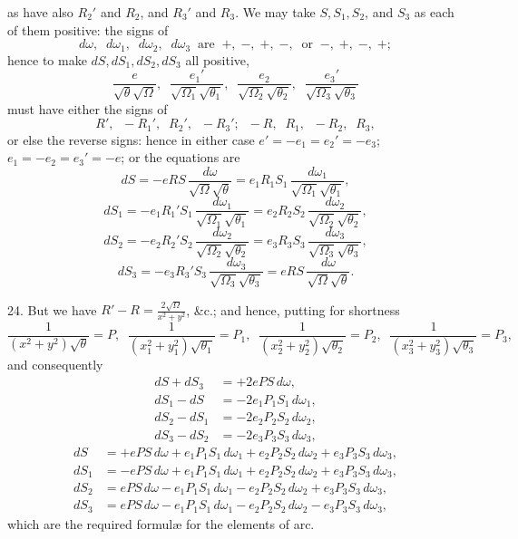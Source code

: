 \documentclass[11pt,a4paper]{article}
\begin{document}
\newpage


\noindent as have also $R_{2}'$ and $R_{2}$, and $R_{3}'$ and $R_{3}$. We may take $S, S_{1}, S_{2}$, and $S_{3}$ as each of them positive: the signs of
\[
d\omega, \;\; d\omega_{1}, \;\; d\omega_{2}, \;\; d\omega_{3} \;\; \text{are} \;\; +,\; -,\; +,\; -,\;\; \text{or}\;\; -,\; +,\; -,\; +;
\]
hence to make $dS, dS_{1}, dS_{2}, dS_{3}$ all positive,
\[
\frac{e}{\sqrt{\theta}\sqrt{\Omega}}, \;\; \frac{e_{1}'}{\sqrt{\Omega_{1}}\sqrt{\theta_{1}}}, \;\; \frac{e_{2}}{\sqrt{\Omega_{2}}\sqrt{\theta_{2}}}, \;\; \frac{e_{3}'}{\sqrt{\Omega_{3}}\sqrt{\theta_{3}}}
\]
must have either the signs of
\[
R',\;\; -R_{1}',\;\; R_{2}',\;\; -R_{3}';\;\; -R,\;\; R_{1},\;\; -R_{2},\;\; R_{3},
\]
or else the reverse signs: hence in either case $e' = -e_{1} = e_{2}' = -e_{3}$; $e_{1} = -e_{2} = e_{3}' = -e$; or the equations are
\[
dS = -eRS\,\frac{d\omega}{\sqrt{\Omega}\sqrt{\theta}} = e_{1}R_{1}S_{1}\,\frac{d\omega_{1}}{\sqrt{\Omega_{1}}\sqrt{\theta_{1}}},
\]
\[
dS_{1} = -e_{1}R_{1}'S_{1}\,\frac{d\omega_{1}}{\sqrt{\Omega_{1}}\sqrt{\theta_{1}}} = e_{2}R_{2}S_{2}\,\frac{d\omega_{2}}{\sqrt{\Omega_{2}}\sqrt{\theta_{2}}},
\]
\[
dS_{2} = -e_{2}R_{2}'S_{2}\,\frac{d\omega_{2}}{\sqrt{\Omega_{2}}\sqrt{\theta_{2}}} = e_{3}R_{3}S_{3}\,\frac{d\omega_{3}}{\sqrt{\Omega_{3}}\sqrt{\theta_{3}}},
\]
\[
dS_{3} = -e_{3}R_{3}'S_{3}\,\frac{d\omega_{3}}{\sqrt{\Omega_{3}}\sqrt{\theta_{3}}} = eRS\,\frac{d\omega}{\sqrt{\Omega}\sqrt{\theta}}.
\]

\medskip

24. But we have $R' - R = \frac{2\sqrt{\Omega}}{x^{2} + y^{2}}$, \&c.; and hence, putting for shortness
\[
\frac{1}{(x^{2} + y^{2})\sqrt{\theta}} = P, \;\; \frac{1}{(x_{1}^{2} + y_{1}^{2})\sqrt{\theta_{1}}} = P_{1}, \;\; \frac{1}{(x_{2}^{2} + y_{2}^{2})\sqrt{\theta_{2}}} = P_{2}, \;\; \frac{1}{(x_{3}^{2} + y_{3}^{2})\sqrt{\theta_{3}}} = P_{3},
\]
and consequently
\begin{align*}
dS + dS_{3} &= +2ePS\,d\omega,\\
dS_{1} - dS &= -2e_{1}P_{1}S_{1}\,d\omega_{1},\\
dS_{2} - dS_{1} &= -2e_{2}P_{2}S_{2}\,d\omega_{2},\\
dS_{3} - dS_{2} &= -2e_{3}P_{3}S_{3}\,d\omega_{3},
\end{align*}
\begin{align*}
dS &= +ePS\,d\omega + e_{1}P_{1}S_{1}\,d\omega_{1} + e_{2}P_{2}S_{2}\,d\omega_{2} + e_{3}P_{3}S_{3}\,d\omega_{3},\\
dS_{1} &= -ePS\,d\omega + e_{1}P_{1}S_{1}\,d\omega_{1} + e_{2}P_{2}S_{2}\,d\omega_{2} + e_{3}P_{3}S_{3}\,d\omega_{3},\\
dS_{2} &= ePS\,d\omega - e_{1}P_{1}S_{1}\,d\omega_{1} - e_{2}P_{2}S_{2}\,d\omega_{2} + e_{3}P_{3}S_{3}\,d\omega_{3},\\
dS_{3} &= ePS\,d\omega - e_{1}P_{1}S_{1}\,d\omega_{1} - e_{2}P_{2}S_{2}\,d\omega_{2} - e_{3}P_{3}S_{3}\,d\omega_{3},
\end{align*}
which are the required formul\ae{} for the elements of arc.
\end{document}
